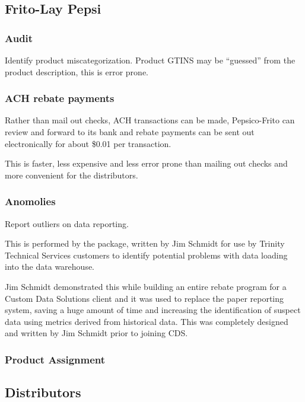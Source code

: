 \documentclass[letterpaper,10pt,english]{sphinxmanual}
\begin{document}
\subsection{Frito-Lay Pepsi}
\label{\detokenize{Benefits:frito-lay-pepsi}}

\subsubsection{Audit}
\label{\detokenize{Benefits:audit}}
Identify product miscategorization.  Product GTINS may be “guessed” from the product description,
this is error prone.


\subsubsection{ACH rebate payments}
\label{\detokenize{Benefits:ach-rebate-payments}}
Rather than mail out checks, ACH transactions can be made, Pepsico-Frito can review and forward to
its bank and rebate payments can be sent out electronically for about \$0.01 per transaction.

This is faster, less expensive and less error prone than mailing out checks and more convenient for
the distributors.


\subsubsection{Anomolies}
\label{\detokenize{Benefits:anomolies}}
Report outliers on data reporting.

This is performed by the   package, written by
Jim Schmidt for use by Trinity Technical Services customers to identify potential problems
with data loading into the data warehouse.

Jim Schmidt demonstrated this while building an entire rebate program for a Custom Data Solutions
client and it was used to replace the paper reporting system, saving a huge amount of time and increasing
the identification of suspect data using metrics derived from historical data.  This was completely
designed and written by Jim Schmidt prior to joining CDS.


\subsubsection{Product Assignment}
\label{\detokenize{Benefits:product-assignment}}

\subsection{Distributors}
\label{\detokenize{Benefits:distributors}}
\end{document}
